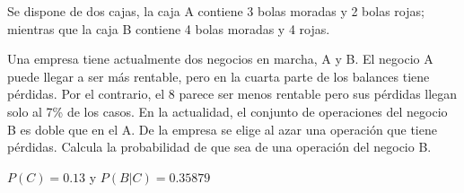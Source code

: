 \documentclass[addpoints,spanish, 12pt,a4paper]{exam}
\begin{document}
\begin{questions}


        \question Se dispone de dos cajas, la caja A contiene 3 bolas moradas y 2 bolas rojas; mientras que la caja B contiene 4
    bolas moradas y 4 rojas.
        \begin{multicols}{1}
        \end{multicols}
        
        
\question Una empresa tiene actualmente dos negocios en marcha, A y B. El negocio A puede llegar a ser más rentable, pero en la cuarta parte de los balances tiene pérdidas. Por el contrario, el 8 parece ser menos rentable pero sus pérdidas llegan solo al 7\% de los casos. En la actualidad, el conjunto de operaciones del negocio B es doble que en el A. De la empresa se elige al azar una operación que tiene pérdidas. Calcula la probabilidad de que sea de una operación del negocio B. 
\begin{solution}
$P(C)=0.13$ y $P(B|C)=0.35879$
\end{solution}


\end{questions}
\end{document}
